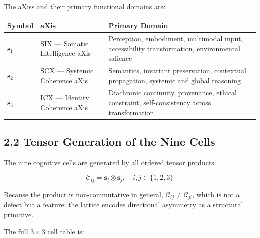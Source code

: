 The aXiss and their primary functional domains are:

{\def\LTcaptype{none} %
\begin{longtable}[]{@{}
  >{\raggedright\arraybackslash}p{}
  >{\raggedright\arraybackslash}p{}
  >{\raggedright\arraybackslash}p{}@{}}
\toprule\noalign{}
\begin{minipage}[b]{\linewidth}\raggedright
Symbol
\end{minipage} & \begin{minipage}[b]{\linewidth}\raggedright
aXis
\end{minipage} & \begin{minipage}[b]{\linewidth}\raggedright
Primary Domain
\end{minipage} \\
\midrule\noalign{}
\endhead
\bottomrule\noalign{}
\endlastfoot
\(\mathbf{s}_1\) & SIX --- Somatic Intelligence aXis & Perception, embodiment, multimodal input, accessibility transformation, environmental salience \\
\(\mathbf{s}_2\) & SCX --- Systemic Coherence aXis & Semantics, invariant preservation, contextual propagation, systemic and global reasoning \\
\(\mathbf{s}_3\) & ICX --- Identity Coherence aXis & Diachronic continuity, provenance, ethical constraint, self-consistency across transformation \\
\end{longtable}
}

\subsection{2.2 Tensor Generation of the Nine Cells}\label{tensor-generation-of-the-nine-cells}

The nine cognitive cells are generated by all ordered tensor products:

\[
\mathcal{C}_{ij} = \mathbf{s}_i \otimes \mathbf{s}_j, \quad i,j \in \{1,2,3\}
\]

Because the product is non-commutative in general, \(\mathcal{C}_{ij} \neq
\mathcal{C}_{ji}\), which is not a defect but a feature: the lattice encodes directional asymmetry as a structural primitive.

The full \(3 \times 3\) cell table is:

